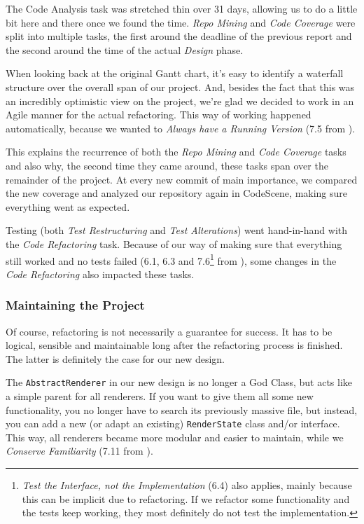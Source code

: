 \documentclass[11pt]{article}
\begin{document}
	The \textsf{Code Analysis} task was stretched thin over 31 days, allowing us to do a little bit here and there once we found the time. \textsl{Repo Mining} and \textsl{Code Coverage} were split into multiple tasks, the first around the deadline of the previous report and the second around the time of the actual \textsl{Design} phase.
	
	When looking back at the original \textsf{Gantt} chart, it's easy to identify a waterfall structure over the overall span of our project. And, besides the fact that this was an incredibly optimistic view on the project, we're glad we decided to work in an \textsf{Agile} manner for the actual refactoring. This way of working happened automatically, because we wanted to \textsl{Always have a Running Version} (7.5 from \cite{demeyer2009object}).
	
	This explains the recurrence of both the \textsl{Repo Mining} and \textsl{Code Coverage} tasks and also why, the second time they came around, these tasks span over the remainder of the project. At every new commit of main importance, we compared the new coverage and analyzed our repository again in \textsf{CodeScene}, making sure everything went as expected.
	
	Testing (both \textsl{Test Restructuring} and \textsl{Test Alterations}) went hand-in-hand with the \textsl{Code Refactoring} task. Because of our way of making sure that everything still worked and no tests failed (6.1, 6.3 and 7.6\footnote{\textsl{Test the Interface, not the Implementation} (6.4) also applies, mainly because this can be implicit due to refactoring. If we refactor some functionality and the tests keep working, they most definitely do not test the implementation.} from \cite{demeyer2009object}), some changes in the \textsl{Code Refactoring} also impacted these tasks.
	
	\subsubsection{Maintaining the Project}
	Of course, refactoring is not necessarily a guarantee for success. It has to be logical, sensible and maintainable long after the refactoring process is finished. The latter is definitely the case for our new design.
	
	The \texttt{AbstractRenderer} in our new design is no longer a God Class, but acts like a simple parent for all renderers. If you want to give them all some new functionality, you no longer have to search its previously massive file, but instead, you can add a new (or adapt an existing) \texttt{RenderState} class and/or interface. This way, all renderers became more modular and easier to maintain, while we \textsl{Conserve Familiarity} (7.11 from \cite{demeyer2009object}).
	
\end{document}
